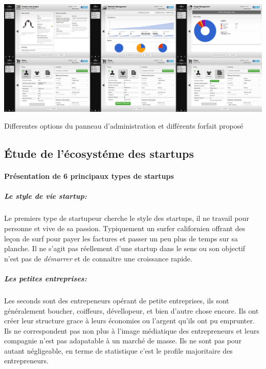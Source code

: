 \documentclass[11pt, a4paper ]{article}
\begin{document}
\begin{spacing}{1.5}
\begin{center}
	\includegraphics[width=\textwidth]{images/HBscreen/dash.png}
	\caption{Differentes options du panneau d'administration et différents forfait proposé}
\end{center}

	
	\subsection{Étude de l'écosystéme des startups}		

		\paragraph{Présentation de 6 principaux\cite{typeStartup} types de startups}

			\subparagraph{Le style de vie startup:} %
Le premiers type de startupeur cherche le style des startups, il ne travail pour personne et vive de sa passion. Typiquement un surfer californien offrant des leçon de surf pour payer les factures et passer un peu plus de temps sur sa planche. Il ne s'agit pas réellement d'une startup dans le sens ou son objectif n'est pas de \emph{démarrer} et de connaitre une croissance rapide.

			\subparagraph{Les petites entreprises:} %
Les seconds sont des entrepeneurs opérant de petite entreprises, ils sont généralement boucher, coiffeurs, dévellopeur, et bien d'autre chose encore. Ils ont créer leur structure grace à leurs économies ou l'argent qu'ils ont pu emprunter. Ils ne correspondent pas non plus à l'image médiatique des entrepreneurs et leurs compagnie n'est pas adapatable à un marché de masse. Ils ne sont pas pour autant négligeable, en terme de statistique c'est le profile majoritaire des entrepreneurs.


\end{spacing}
\end{document}
